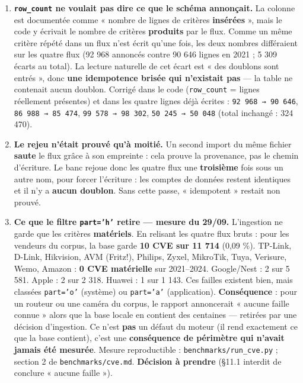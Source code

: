 \documentclass[11pt,a4paper]{article}
\begin{document}
\begin{enumerate}  \item \textbf{\texttt{row\_\allowbreak{}count} ne voulait pas dire ce que le schéma annonçait.} La colonne est documentée comme « nombre de lignes de critères \textbf{insérées} », mais le code y écrivait le nombre de critères \textbf{produits} par le flux. Comme un même critère répété dans un flux n'est écrit qu'une fois, les deux nombres différaient sur les quatre flux (92 968 annoncés contre 90 646 lignes en 2021 ; 5 309 écarts au total). La lecture naturelle de cet écart est « des doublons sont entrés », donc \textbf{une idempotence brisée qui n'existait pas} — la table ne contenait aucun doublon. Corrigé dans le code (\texttt{row\_\allowbreak{}count} = lignes réellement présentes) et dans les quatre lignes déjà écrites : \texttt{92 968 → 90 646}, \texttt{86 988 → 85 474}, \texttt{99 578 → 98 302}, \texttt{50 245 → 50 048} (total inchangé : 324 470).
  \item \textbf{Le rejeu n'était prouvé qu'à moitié.} Un second import du même fichier \textbf{saute} le flux grâce à son empreinte : cela prouve la provenance, pas le chemin d'écriture. Le banc rejoue donc les quatre flux une \textbf{troisième} fois sous un autre nom, pour forcer l'écriture : les comptes de données restent identiques et il n'y a \textbf{aucun doublon}. Sans cette passe, « idempotent » restait non prouvé.
  \item \textbf{Ce que le filtre \texttt{part='h'} retire — mesure du 29/09.} L'ingestion ne garde que les critères \textbf{matériels}. En relisant les quatre flux bruts : pour les vendeurs du corpus, la base garde \textbf{10 CVE sur 11 714} (0,09 \%). TP-Link, D-Link, Hikvision, AVM (Fritz!), Philips, Zyxel, MikroTik, Tuya, Verisure, Wemo, Amazon : \textbf{0 CVE matérielle} sur 2021–2024. Google/Nest : 2 sur 5 581. Apple : 2 sur 2 318. Huawei : 1 sur 1 143. Ces failles existent bien, mais classées \texttt{part='o'} (système) ou \texttt{part='a'} (application). \textbf{Conséquence} : pour un routeur ou une caméra du corpus, le rapport annoncerait « aucune faille connue » alors que la base locale en contient des centaines — retirées par une décision d'ingestion. Ce n'est \textbf{pas} un défaut du moteur (il rend exactement ce que la base contient), c'est une \textbf{conséquence de périmètre qui n'avait jamais été mesurée}. Mesure reproductible : \texttt{benchmarks/run\_\allowbreak{}cve.py} ; section 2 de \texttt{benchmarks/cve.md}. \textbf{Décision à prendre} (§11.1 interdit de conclure « aucune faille »).
\end{enumerate}
\end{document}
